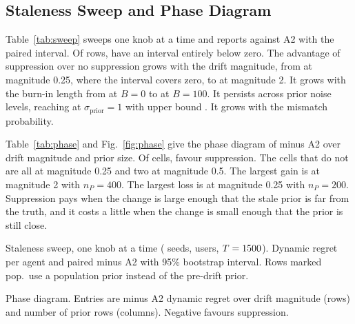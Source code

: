 \subsection{Staleness Sweep and Phase Diagram}
Table~\ref{tab:sweep} sweeps one knob at a time and reports \des{} against A2 with the paired interval. Of \sweepRows{} rows, \sweepSigRows{} have an interval entirely below zero. The advantage of suppression over no suppression grows with the drift magnitude, from \sweepMagPreZeropTwoFive{} at magnitude 0.25, where the interval covers zero, to \sweepMagPreTwo{} at magnitude 2. It grows with the burn-in length from \sweepBurnZero{} at $B=0$ to \sweepBurnHundred{} at $B=100$. It persists across prior noise levels, reaching \sweepSigmaPriorLarge{} at $\sigma_{\mathrm{prior}}=1$ with upper bound \sweepSigmaPriorLargeHi. It grows with the mismatch probability.

Table~\ref{tab:phase} and Fig.~\ref{fig:phase} give the phase diagram of \des{} minus A2 over drift magnitude and prior size. Of \phaseCells{} cells, \phaseNegCells{} favour suppression. The cells that do not are all at magnitude 0.25 and two at magnitude 0.5. The largest gain is \phaseMinDiff{} at magnitude 2 with $n_P=400$. The largest loss is \phaseMaxDiff{} at magnitude 0.25 with $n_P=200$. Suppression pays when the change is large enough that the stale prior is far from the truth, and it costs a little when the change is small enough that the prior is still close.

\begin{table}[t]
\centering
\caption{Staleness sweep, one knob at a time (\expSweepSeeds{} seeds, \expSweepUsers{} users, $T=\expSweepT$). Dynamic regret per agent and paired \des{} minus A2 with 95\% bootstrap interval. Rows marked pop.\ use a population prior instead of the pre-drift prior.}
\label{tab:sweep}
\small
\begin{adjustbox}{max width=\columnwidth}

\end{adjustbox}
\end{table}

\begin{table}[t]
\centering
\caption{Phase diagram. Entries are \des{} minus A2 dynamic regret over drift magnitude (rows) and number of prior rows (columns). Negative favours suppression.}
\label{tab:phase}
\small
\begin{adjustbox}{max width=\columnwidth}

\end{adjustbox}
\end{table}

